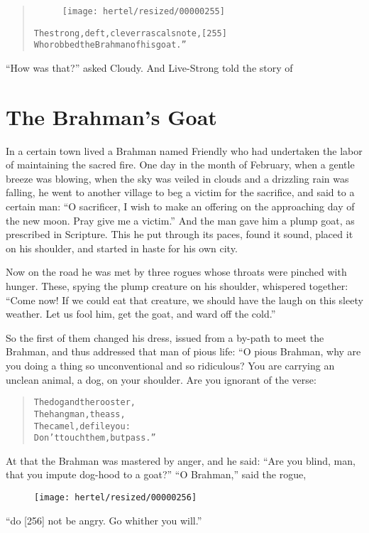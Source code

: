 \documentclass[article, twoside, 10pt]{memoir}
\renewenvironment{verbatim}{%
\begin{quote}%
\vskip -10pt%
\begin{alltt}\normalfont\small}{\end{alltt}%
\end{quote}%
\vskip -10pt
} %
\begin{document}
\begin{verbatim}
\begin{figure}[p]\texttt{[image: hertel/resized/00000255]}\end{figure}The strong, deft, clever rascals note,                  [255]
Who robbed the Brahman of his goat.”
\end{verbatim}
``How was that?'' asked Cloudy. And Live-Strong told the story of

\chapter{The Brahman's Goat}

In a certain town lived a Brahman named Friendly who had undertaken
the labor of maintaining the sacred fire. One day in the month of
February, when a gentle breeze was blowing, when the sky was veiled
in clouds and a drizzling rain was falling, he went to another
village to beg a victim for the sacrifice, and said to a certain
man:
``O sacrificer, I wish to make an offering on the approaching day of the new moon. Pray give me a victim.''
And the man gave him a plump goat, as prescribed in Scripture. This
he put through its paces, found it sound, placed it on his
shoulder, and started in haste for his own city.

Now on the road he was met by three rogues whose throats were
pinched with hunger. These, spying the plump creature on his
shoulder, whispered together:
``Come now! If we could eat that creature, we should have the laugh on this sleety weather. Let us fool him, get the goat, and ward off the cold.''

So the first of them changed his dress, issued from a by-path to
meet the Brahman, and thus addressed that man of pious life: “O
pious Brahman, why are you doing a thing so unconventional and so
ridiculous? You are carrying an unclean animal, a dog, on your
shoulder. Are you ignorant of the verse:

\begin{verbatim}
The dog and the rooster,
The hangman, the ass,
The camel, defile you:
Don't touch them, but pass.”
\end{verbatim}
At that the Brahman was mastered by anger, and he said:
``Are you blind, man, that you impute dog-hood to a goat?''
``O Brahman,'' said the rogue,
\begin{figure}[p]\texttt{[image: hertel/resized/00000256]}\end{figure}``do [256] not be angry. Go whither you will.''
\end{document}
